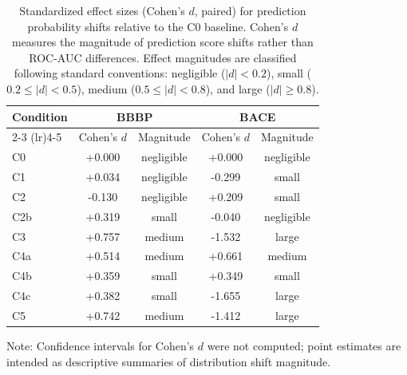\begin{table}[ht]
\centering
\caption{Standardized effect sizes (Cohen's $d$, paired) for prediction probability shifts relative to the C0 baseline. Cohen's $d$ measures the magnitude of prediction score shifts rather than ROC-AUC differences. Effect magnitudes are classified following standard conventions: negligible ($|d| < 0.2$), small ($0.2 \leq |d| < 0.5$), medium ($0.5 \leq |d| < 0.8$), and large ($|d| \geq 0.8$).}
\label{tab:effect_sizes}
\begin{tabular}{lcccc}
\toprule
\textbf{Condition} & \multicolumn{2}{c}{\textbf{BBBP}} & \multicolumn{2}{c}{\textbf{BACE}} \\
\cmidrule(lr){2-3} \cmidrule(lr){4-5}
 & Cohen's $d$ & Magnitude & Cohen's $d$ & Magnitude \\
\midrule
C0 & +0.000 & negligible & +0.000 & negligible \\
C1 & +0.034 & negligible & -0.299 & small \\
C2 & -0.130 & negligible & +0.209 & small \\
C2b & +0.319 & small & -0.040 & negligible \\
C3 & +0.757 & medium & -1.532 & large \\
C4a & +0.514 & medium & +0.661 & medium \\
C4b & +0.359 & small & +0.349 & small \\
C4c & +0.382 & small & -1.655 & large \\
C5 & +0.742 & medium & -1.412 & large \\
\bottomrule
\end{tabular}

\vspace{0.5em}
{\footnotesize Note: Confidence intervals for Cohen's $d$ were not computed; point estimates are intended as descriptive summaries of distribution shift magnitude.}
\end{table}
